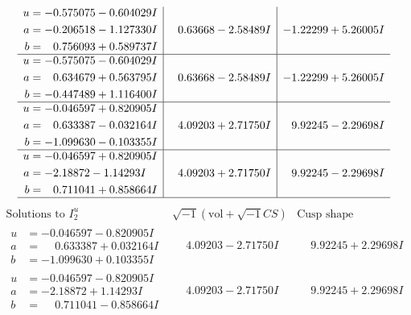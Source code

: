 \documentclass[1p]{elsarticle_modified}
\theoremstyle{definition}
\newcommand{\I}{\sqrt{-1}}
\begin{document}
$$\begin{array}{c|c|c}
\begin{aligned}
u &= -0.575075 - 0.604029 I \\
a &= -0.206518 - 1.127330 I \\
b &= \phantom{-}0.756093 + 0.589737 I\end{aligned}
 & \phantom{-}0.63668 - 2.58489 I & -1.22299 + 5.26005 I \\ \hline\begin{aligned}
u &= -0.575075 - 0.604029 I \\
a &= \phantom{-}0.634679 + 0.563795 I \\
b &= -0.447489 + 1.116400 I\end{aligned}
 & \phantom{-}0.63668 - 2.58489 I & -1.22299 + 5.26005 I \\ \hline\begin{aligned}
u &= -0.046597 + 0.820905 I \\
a &= \phantom{-}0.633387 - 0.032164 I \\
b &= -1.099630 - 0.103355 I\end{aligned}
 & \phantom{-}4.09203 + 2.71750 I & \phantom{-}9.92245 - 2.29698 I \\ \hline\begin{aligned}
u &= -0.046597 + 0.820905 I \\
a &= -2.18872 - 1.14293 I \\
b &= \phantom{-}0.711041 + 0.858664 I\end{aligned}
 & \phantom{-}4.09203 + 2.71750 I & \phantom{-}9.92245 - 2.29698 I\\
 \hline 
 \end{array}$$\newpage$$\begin{array}{c|c|c}  
\text{Solutions to }I^u_{2}& \I (\text{vol} + \sqrt{-1}CS) & \text{Cusp shape}\\
 \hline 
\begin{aligned}
u &= -0.046597 - 0.820905 I \\
a &= \phantom{-}0.633387 + 0.032164 I \\
b &= -1.099630 + 0.103355 I\end{aligned}
 & \phantom{-}4.09203 - 2.71750 I & \phantom{-}9.92245 + 2.29698 I \\ \hline\begin{aligned}
u &= -0.046597 - 0.820905 I \\
a &= -2.18872 + 1.14293 I \\
b &= \phantom{-}0.711041 - 0.858664 I\end{aligned}
 & \phantom{-}4.09203 - 2.71750 I & \phantom{-}9.92245 + 2.29698 I \\ \hline\begin{aligned}

\end{aligned}
\end{array}$$
\end{document}
